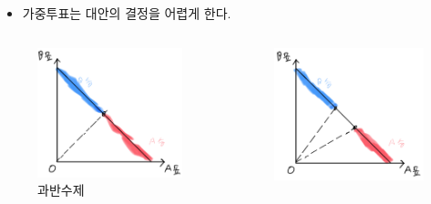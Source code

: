 \documentclass[aspectratio=169,xcolor=dvipsnames,handout]{beamer}
\begin{document}
\begin{frame}
    \begin{itemize}
        \item 가중투표는 대안의 결정을 어렵게 한다.
    \end{itemize}
    \begin{columns}
        \begin{column}{.5\textwidth}
            \begin{figure}
                \centering
                \includegraphics[scale=.2]{pic/onehalf.png}
                \caption{과반수제}
            \end{figure}
        \end{column}    
        \begin{column}{.5\textwidth}
            \begin{figure}
                \centering
                \includegraphics[scale=.2]{pic/twothird.png}

\end{figure}
\end{column}
\end{columns}
\end{frame}
\end{document}
